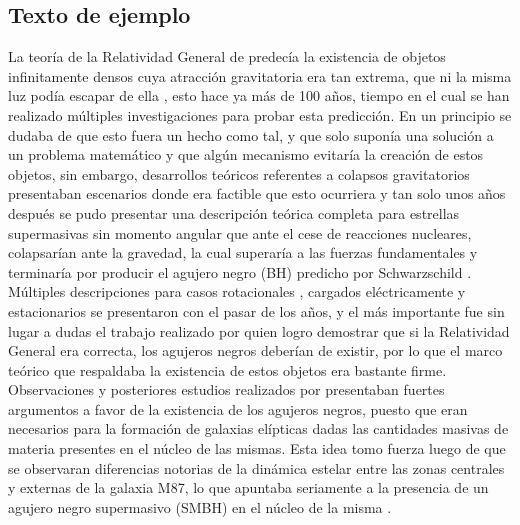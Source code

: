 \documentclass[11pt,letterpaper]{article}
\begin{document}
\subsection*{Texto de ejemplo}
La teoría de la Relatividad General de \cite{Einstein1915} predecía la existencia de objetos infinitamente densos cuya atracción gravitatoria era tan extrema, que ni la misma luz podía escapar de ella \citep{Schwarzschild_2003}, esto hace ya más de 100 años, tiempo en el cual se han realizado múltiples investigaciones para probar esta predicción. En un principio se dudaba de que esto fuera un hecho como tal, y que solo suponía una solución a un problema matemático y que algún mecanismo evitaría la creación de estos objetos, sin embargo, desarrollos teóricos referentes a colapsos gravitatorios presentaban escenarios donde era factible que esto ocurriera \citep{10.1093/mnras/91.5.456} y tan solo unos años después se pudo presentar una descripción teórica completa para estrellas supermasivas sin momento angular que ante el cese de reacciones nucleares, colapsarían ante la gravedad, la cual superaría a las fuerzas fundamentales y terminaría por producir el agujero negro (BH) predicho por Schwarzschild \citep{PhysRev.56.455}. Múltiples descripciones para casos rotacionales \citep{PhysRevLett.11.237}, cargados eléctricamente \citep{newman1965metric} y estacionarios \citep{israel1967event} se presentaron con el pasar de los años, y el más importante fue sin lugar a dudas el trabajo realizado por \cite{PhysRevLett.14.57} quien logro demostrar que si la Relatividad General era correcta, los agujeros negros deberían de existir, por lo que el marco teórico que respaldaba la existencia de estos objetos era bastante firme.\\
Observaciones y posteriores estudios realizados por \cite{1970ApJ...161..419W} presentaban fuertes argumentos a favor de la existencia de los agujeros negros, puesto que eran necesarios para la formación de galaxias elípticas dadas las cantidades masivas de materia presentes en el núcleo de las mismas. Esta idea tomo fuerza luego de que se observaran diferencias notorias de la dinámica estelar entre las zonas centrales y externas de la galaxia M87, lo que apuntaba seriamente a la presencia de un agujero negro supermasivo (SMBH) en el núcleo de la misma \citep{sargent1978dynamical}.\\
\end{document}
